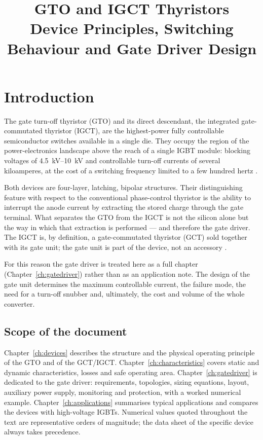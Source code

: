 \documentclass[11pt,a4paper]{report}
\title{GTO and IGCT Thyristors\\[2mm]
\large Device Principles, Switching Behaviour and Gate Driver Design}
\author{}
\date{}
\begin{document}
\maketitle
\tableofcontents

\chapter{Introduction}

The gate turn-off thyristor (GTO) and its direct descendant, the integrated
gate-commutated thyristor (IGCT), are the highest-power fully controllable
semiconductor switches available in a single die. They occupy the region of the
power-electronics landscape above the reach of a single IGBT module: blocking
voltages of \SIrange{4.5}{10}{\kilo\volt} and controllable turn-off currents of
several kiloamperes, at the cost of a switching frequency limited to a few
hundred hertz \cite{bernet2000,rodriguez2007multilevel}.

Both devices are four-layer, latching, bipolar structures. Their distinguishing
feature with respect to the conventional phase-control thyristor is the ability
to interrupt the anode current by extracting the stored charge through the gate
terminal. What separates the GTO from the IGCT is not the silicon alone but the
way in which that extraction is performed --- and therefore the gate driver.
The IGCT is, by definition, a gate-commutated thyristor (GCT) sold together with
its gate unit; the gate unit is part of the device, not an accessory
\cite{klaka1997igct,carroll1997igct}.

For this reason the gate driver is treated here as a full chapter
(Chapter~\ref{ch:gatedriver}) rather than as an application note. The design of
the gate unit determines the maximum controllable current, the failure mode, the
need for a turn-off snubber and, ultimately, the cost and volume of the whole
converter.

\section{Scope of the document}

Chapter~\ref{ch:devices} describes the structure and the physical operating
principle of the GTO and of the GCT/IGCT. Chapter~\ref{ch:characteristics}
covers static and dynamic characteristics, losses and safe operating area.
Chapter~\ref{ch:gatedriver} is dedicated to the gate driver: requirements,
topologies, sizing equations, layout, auxiliary power supply, monitoring and
protection, with a worked numerical example. Chapter~\ref{ch:applications}
summarises typical applications and compares the devices with high-voltage
IGBTs. Numerical values quoted throughout the text are representative orders of
magnitude; the data sheet of the specific device always takes precedence.
\end{document}
